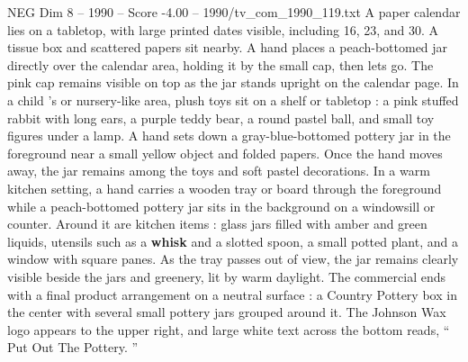 \begin{textsample}{NEG Dim 8 – 1990 – Score -4.00 – 1990/tv\_com\_1990\_119.txt}
A paper calendar lies on a tabletop, with large printed dates visible, including 16, 23, and 30.
A tissue box and scattered papers sit nearby.
A hand places a peach-bottomed jar directly over the calendar area, holding it by the small cap, then lets go.
The pink cap remains visible on top as the jar stands upright on the calendar page.
In a child ’s or nursery-like area, plush toys sit on a shelf or tabletop : a pink stuffed rabbit with long ears, a purple teddy bear, a round pastel ball, and small toy figures under a lamp.
A hand sets down a gray-blue-bottomed pottery jar in the foreground near a small yellow object and folded papers.
Once the hand moves away, the jar remains among the toys and soft pastel decorations.
In a warm kitchen setting, a hand carries a wooden tray or board through the foreground while a peach-bottomed pottery jar sits in the background on a windowsill or counter.
Around it are kitchen items : glass jars filled with amber and green liquids, utensils such as a \textbf{whisk} and a slotted spoon, a small potted plant, and a window with square panes.
As the tray passes out of view, the jar remains clearly visible beside the jars and greenery, lit by warm daylight.
The commercial ends with a final product arrangement on a neutral surface : a Country Pottery box in the center with several small pottery jars grouped around it.
The Johnson Wax logo appears to the upper right, and large white text across the bottom reads, “ Put Out The Pottery. ”

\end{textsample}
